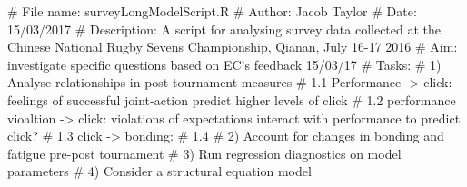 
%
%
%
%
%
%
%
%
%
%
%
%
# File name: surveyLongModelScript.R
# Author: Jacob Taylor
# Date: 15/03/2017
# Description: A script for analysing survey data collected at the Chinese National Rugby Sevens Championship, Qianan, July 16-17 2016
# Aim: investigate specific questions based on EC's feedback 15/03/17
# Tasks:
#         1) Analyse relationships in post-tournament measures
#                1.1 Performance -> click: feelings of successful joint-action predict higher levels of click
#                1.2 performance vioaltion -> click: violations of expectations interact with performance to predict click?
#                1.3 click -> bonding:
#                1.4
#         2) Account for changes in bonding and fatigue pre-post tournament
#         3) Run regression diagnostics on model parameters
#         4) Consider a structural equation model

